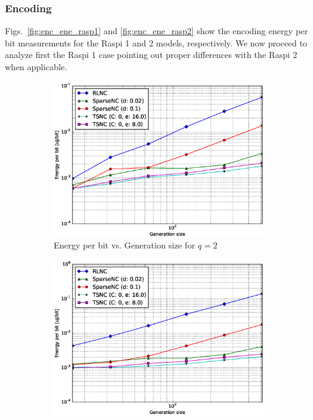 \subsubsection{Encoding}
Figs.~\ref{fig:enc_ene_rasp1} and \ref{fig:enc_ene_rasp2} show the encoding
energy per bit measurements for the \ac{Raspi} 1 and 2 models, respectively.
We now proceed to analyze first the \ac{Raspi} 1 case pointing out proper
differences with the \ac{Raspi} 2 when applicable.
%
\begin{figure}
    \centering
    \begin{subfigure}[b]{0.475\textwidth}
        \centering
        \includegraphics[width=1.05\textwidth]{images/06_06_2016/energy_per_bit_vs_generation_size_Rasp_Binary_encoder_1600.eps}
        \caption[]%
        {{\small Energy per bit vs. Generation size for $q = 2$}}
        \label{fig:enc_ene_rasp1_gen_gf2}
    \end{subfigure}
    \hfill
    \begin{subfigure}[b]{0.475\textwidth}
        \centering
        \includegraphics[width=1.05\textwidth]{images/06_06_2016/energy_per_bit_vs_generation_size_Rasp_Binary8_encoder_1600.eps}

\end{subfigure}
\end{figure}
